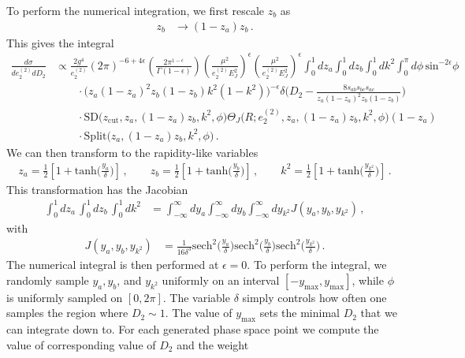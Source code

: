 \documentclass[a4paper,11pt]{article}
\newcommand{\ecf}[2]{e_{#1}^{(#2)}}
\newcommand{\nn}{\nonumber}
\def\zcut{z_{\text{cut}}}
\begin{document}
To perform the numerical integration, we first rescale $z_b$ as
\begin{align}
z_b&\rightarrow (1-z_a)z_b\,.
\end{align}
This gives the integral
{\small\begin{align}
\frac{d\sigma}{d\ecf{2}{2} dD_2}&\propto \frac{2g^4}{\ecf{2}{2}}(2\pi)^{-6+4\epsilon}\left(\frac{2\pi^{1-\epsilon}}{\Gamma(1-\epsilon)}\right)\left(\frac{\mu^2}{\ecf{2}{2}E_J^2}\right)^{\epsilon}\left(\frac{\mu^2}{\ecf{2}{2}E_J^2}\right)^{\epsilon}\int_0^1dz_a\int_0^1dz_b\int_0^1dk^2\int_0^{\pi}d\phi\,\text{sin}^{-2\epsilon}\phi\,\nonumber\\
&\qquad\cdot\Big(z_a(1-z_a)^2z_b(1-z_b)k^2(1-k^2)\Big)^{-\epsilon}\delta\Bigg(D_2-\frac{8s_{ab}s_{bc}s_{ac}}{z_a(1-z_a)^2z_b(1-z_b)}\Bigg)\nonumber\\
&\qquad\cdot \text{SD}\Big(\zcut,z_a,(1-z_a)z_b,k^2,\phi\Big)\Theta_{J}\Big(R;\ecf{2}{2},z_a,(1-z_a)z_b,k^2,\phi\Big)(1-z_a)\nn \\
&\qquad\cdot\text{Split}\Big(z_a,(1-z_a)z_b,k^2,\phi\Big)\,.
\end{align}}
%
We can then transform to the rapidity-like variables
\begin{align}
z_a=\frac{1}{2}\left[1+\text{tanh}\Big(\frac{y_a}{\delta}\Big)\right]\,,\qquad
z_b=\frac{1}{2}\left[1+\text{tanh}\Big(\frac{y_b}{\delta}\Big)\right]\,,\qquad
k^2=\frac{1}{2}\left[1+\text{tanh}\Big(\frac{y_{k^2}}{\delta}\Big)\right]\,.
\end{align}
This transformation has the Jacobian
\begin{align}\label{eq:rapidity_jacobin}
\int_0^1dz_a\,\int_0^1dz_b\,\int_0^1dk^2&=\int_{-\infty}^{\infty}dy_a\int_{-\infty}^{\infty} dy_b \int_{-\infty}^{\infty}dy_{k^2} J(y_a,y_b,y_{k^2})\,,
\end{align}
with
\begin{align}
J(y_a,y_b,y_{k^2})&=\frac{1}{16\delta^3}\text{sech}^2\Big(\frac{y_a}{\delta}\Big)\text{sech}^2\Big(\frac{y_b}{\delta}\Big)\text{sech}^2\Big(\frac{y_{k^2}}{\delta}\Big)\,.
\end{align}
The numerical integral is then performed at $\epsilon=0$. To perform the integral, we randomly sample $y_{a}, y_{b}$, and $y_{k^2}$ uniformly on an interval $[-y_{\text{max}},y_{\text{max}}]$, while $\phi$ is uniformly sampled on $[0,2\pi]$. The variable $\delta$ simply controls how often one samples the region where $D_2\sim 1$. The value of $y_{\text{max}}$ sets the minimal $D_2$ that we can integrate down to. For each generated phase space point we compute the value of corresponding value of $D_2$ and the weight
\end{document}
